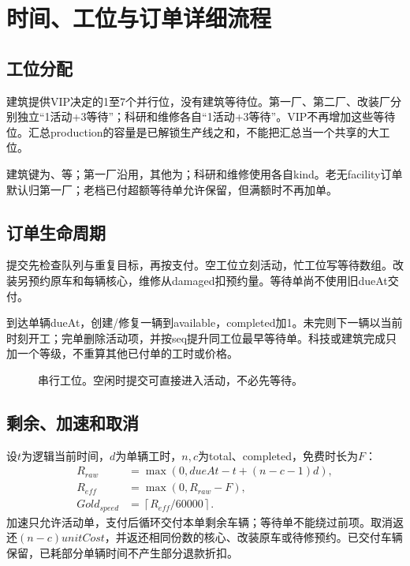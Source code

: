 \chapter{时间、工位与订单详细流程}
\section{工位分配}
建筑提供VIP决定的1至7个并行位，没有建筑等待位。第一厂、第二厂、改装厂分别独立“1活动+3等待”；科研和维修各自“1活动+3等待”。VIP不再增加这些等待位。汇总production的容量是已解锁生产线之和，不能把汇总当一个共享的大工位。

建筑键为、等；第一厂沿用，其他为；科研和维修使用各自kind。老无facility订单默认归第一厂；老档已付超额等待单允许保留，但满额时不再加单。

\section{订单生命周期}
提交先检查队列与重复目标，再按支付。空工位立刻活动，忙工位写等待数组。改装另预约原车和每辆核心，维修从damaged扣预约量。等待单尚不使用旧dueAt交付。

到达单辆dueAt，创建/修复一辆到available，completed加1。未完则下一辆以当前时刻开工；完单删除活动项，并按seq提升同工位最早等待单。科技或建筑完成只加一个等级，不重算其他已付单的工时或价格。

\begin{figure}[htbp]\centering
{}
\caption{串行工位。空闲时提交可直接进入活动，不必先等待。}
\end{figure}

\section{剩余、加速和取消}
设\(t\)为逻辑当前时间，\(d\)为单辆工时，\(n,c\)为total、completed，免费时长为\(F\)：
\begin{align}
R_{raw}&=\max(0,dueAt-t+(n-c-1)d),\\
R_{eff}&=\max(0,R_{raw}-F),\\
Gold_{speed}&=\left\lceil R_{eff}/60000\right\rceil.
\end{align}
加速只允许活动单，支付后循环交付本单剩余车辆；等待单不能绕过前项。取消返还\((n-c)unitCost\)，并返还相同份数的核心、改装原车或待修预约。已交付车辆保留，已耗部分单辆时间不产生部分退款折扣。

